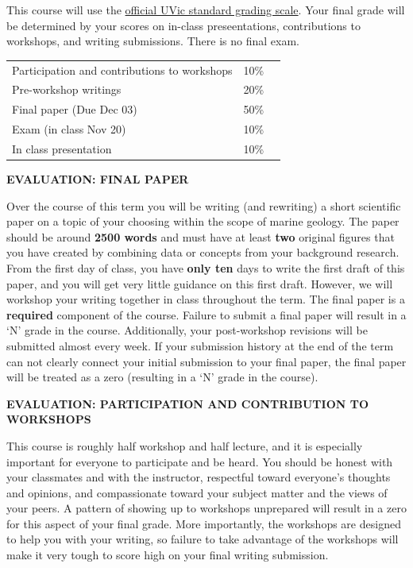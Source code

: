 \documentclass[11pt]{article}
\begin{document}
This course will use the \href{https://www.uvic.ca/calendar/future/undergrad/index.php#/policy/S1AAgoGuV?bc=true&bcCurrent=14%20-%20Grading&bcGroup=Undergraduate%20Academic%20Regulations&bcItemType=policies}{official UVic standard grading scale}. Your final grade will be determined by your scores on in-class preseentations, contributions to workshops, and writing submissions. There is no final exam.

\begin{center}
	\begin{tabular}{ L{.68\linewidth}R{.1\linewidth} R{.33\linewidth} }
		Participation and contributions to workshops & 10\% \\
		Pre-workshop writings                        & 20\% \\
		Final paper (Due Dec 03)                     & 50\% \\
		Exam (in class Nov 20)                       & 10\% \\
		In class presentation                        & 10\% \\
	\end{tabular}
\end{center}

\textbf{EVALUATION: FINAL PAPER}

Over the course of this term you will be writing (and rewriting) a short scientific paper on a topic of your choosing within the scope of marine geology. The paper should be around \textbf{2500 words} and must have at least \textbf{two} original figures that you have created by combining data or concepts from your background research. From the first day of class, you have \textbf{only ten} days to write the first draft of this paper, and you will get very little guidance on this first draft. However, we will workshop your writing together in class throughout the term. The final paper is a \textbf{required} component of the course. Failure to submit a final paper will result in a `N' grade in the course. Additionally, your post-workshop revisions will be submitted almost every week. If your submission history at the end of the term can not clearly connect your initial submission to your final paper, the final paper will be treated as a zero (resulting in a `N' grade in the course).

\textbf{EVALUATION: PARTICIPATION AND CONTRIBUTION TO WORKSHOPS}

This course is roughly half workshop and half lecture, and it is especially important for everyone to participate and be heard.
You should be honest with your classmates and with the instructor, respectful toward everyone's thoughts and opinions, and compassionate toward your subject matter and the views of your peers.
A pattern of showing up to workshops unprepared will result in a zero for this aspect of your final grade.
More importantly, the workshops are designed to help you with your writing, so failure to take advantage of the workshops will make it very tough to score high on your final writing submission.
\end{document}
